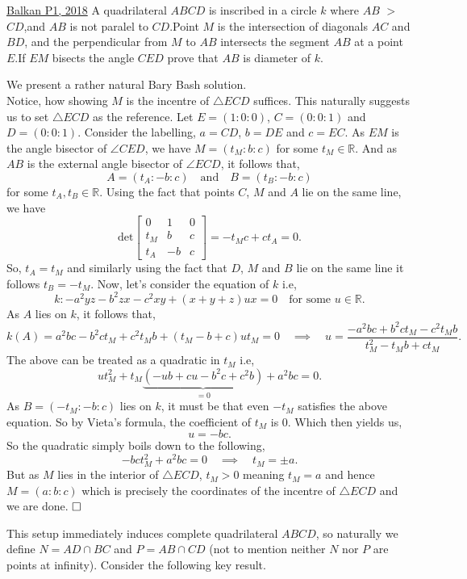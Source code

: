 \begin{problem}{3}{\href{https://artofproblemsolving.com/community/u571929h1640635p35544553}{Balkan P1, 2018}} 
	A quadrilateral $ABCD$ is inscribed in a circle $k$ where $AB$ $>$ $CD$,and $AB$ is not paralel to $CD$.Point $M$ is the intersection of diagonals $AC$ and $BD$, and the perpendicular from $M$ to $AB$ intersects the segment $AB$ at a point $E$.If $EM$ bisects the angle $CED$ prove that $AB$ is diameter of $k$.
	\begin{numsolution}{1} We present a rather natural Bary Bash solution.\\
Notice, how showing $M$ is the incentre of $\triangle ECD$ suffices. This naturally suggests us to set $\triangle ECD$ as the reference. Let $E=(1:0:0)$, $C=(0:0:1)$ and $D=(0:0:1)$. Consider the labelling, $a=CD$, $b=DE$ and $c=EC$. As $EM$ is the angle bisector of $\angle CED$, we have $M=(t_M:b:c)$ for some $t_M\in\mathbb{R}$. And as $AB$ is the external angle bisector of $\angle ECD$, it follows that,
$$A=(t_A:-b:c)\quad\text{and}\quad B=(t_B:-b:c)$$for some $t_A, t_B\in\mathbb{R}$. Using the fact that points $C$, $M$ and $A$ lie on the same line, we have
$$\text{det}\begin{bmatrix} 0 & 1 & 0\\ t_M & b & c\\ t_A & -b & c \end{bmatrix}=-t_Mc+ct_A=0.$$So, $t_A=t_M$ and similarly using the fact that $D$, $M$ and $B$ lie on the same line it follows $t_B=-t_M$. Now, let's consider the equation of $k$ i.e,
$$k:-a^2yz-b^2zx-c^2xy+(x+y+z)ux=0\quad\text{for some $u\in\mathbb{R}$.}$$As $A$ lies on $k$, it follows that,
$$k(A)=a^2bc-b^2ct_M+c^2t_Mb+(t_M-b+c)ut_M=0\quad\implies\quad u=\frac{-a^2bc+b^2ct_M-c^2t_Mb}{t_M^2-t_Mb+ct_M}.$$The above can be treated as a quadratic in $t_M$ i.e,
$$ut_M^2+t_M\underbrace{(-ub+cu-b^2c+c^2b)}_{=0}+a^2bc=0.$$As $B=(-t_M:-b:c)$ lies on $k$, it must be that even $-t_M$ satisfies the above equation. So by Vieta's formula, the coefficient of $t_M$ is $0$. Which then yields us,
$$u=-bc.$$So the quadratic simply boils down to the following,
$$-bct_M^2+a^2bc=0\quad\implies\quad t_M=\pm a.$$But as $M$ lies in the interior of $\triangle ECD$, $t_M>0$ meaning $t_M=a$ and hence $M=(a:b:c)$ which is precisely the coordinates of the incentre of $\triangle ECD$ and we are done. $\qedwhite$
	\end{numsolution}

	\begin{numsolution}{2}
	This setup immediately induces complete quadrilateral $ABCD$, so naturally we define $N=AD\cap BC$ and $P=AB\cap CD$ (not to mention neither $N$ nor $P$ are points at infinity). Consider the following key result.


\end{numsolution}
\end{problem}
